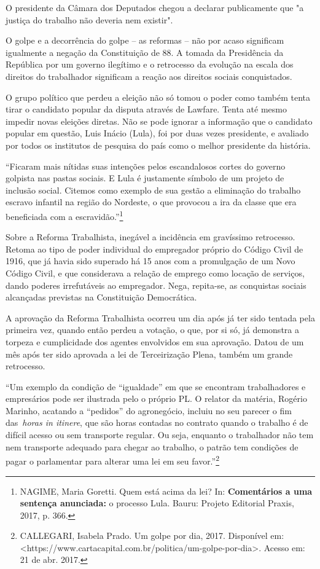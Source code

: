 O presidente da Câmara dos Deputados chegou a declarar publicamente que
"a justiça do trabalho não deveria nem existir".

O golpe e a decorrência do golpe -- as reformas -- não por acaso
significam igualmente a negação da Constituição de 88. A tomada da
Presidência da República por um governo ilegítimo e o retrocesso da
evolução na escala dos direitos do trabalhador significam a reação aos
direitos sociais conquistados.

O grupo político que perdeu a eleição não só tomou o poder como também
tenta tirar o candidato popular da disputa através de Lawfare. Tenta até
mesmo impedir novas eleições diretas. Não se pode ignorar a informação
que o candidato popular em questão, Luis Inácio (Lula), foi por duas
vezes presidente, e avaliado por todos os institutos de pesquisa do país
como o melhor presidente da história.

``Ficaram mais nítidas suas intenções pelos escandalosos cortes do
governo golpista nas pastas sociais. E Lula é justamente símbolo de um
projeto de inclusão social. Citemos como exemplo de sua gestão a
eliminação do trabalho escravo infantil na região do Nordeste, o que
provocou a ira da classe que era beneficiada com a
escravidão.''\footnote{NAGIME, Maria Goretti. Quem está acima da lei?
  In: \textbf{Comentários a uma sentença anunciada:} o processo Lula.
  Bauru: Projeto Editorial Praxis, 2017, p. 366.}

Sobre a Reforma Trabalhista, inegável a incidência em gravíssimo
retrocesso. Retoma ao tipo de poder individual do empregador próprio do
Código Civil de 1916, que já havia sido superado há 15 anos com a
promulgação de um Novo Código Civil, e que considerava a relação de
emprego como locação de serviços, dando poderes irrefutáveis ao
empregador. Nega, repita-se, as conquistas sociais alcançadas previstas
na Constituição Democrática.

A aprovação da Reforma Trabalhista ocorreu um dia após já ter sido
tentada pela primeira vez, quando então perdeu a votação, o que, por si
só, já demonstra a torpeza e cumplicidade dos agentes envolvidos em sua
aprovação. Datou de um mês após ter sido aprovada a lei de Terceirização
Plena, também um grande retrocesso.

``Um exemplo da condição de ``igualdade'' em que se encontram
trabalhadores e empresários pode ser ilustrada pelo o próprio PL. O
relator da matéria, Rogério Marinho, acatando a ``pedidos'' do
agronegócio, incluiu no seu parecer o fim das~\emph{horas in itinere},
que são horas contadas no contrato quando o trabalho é de difícil acesso
ou sem transporte regular. Ou seja, enquanto o trabalhador não tem nem
transporte adequado para chegar ao trabalho, o patrão tem condições de
pagar o parlamentar para alterar uma lei em seu favor.''\footnote{CALLEGARI,
  Isabela Prado. Um golpe por dia, 2017. Disponível
  em:\textless{}https://www.cartacapital.com.br/politica/um-golpe-por-dia\textgreater{}.
  Acesso em: 21 de abr. 2017.}

